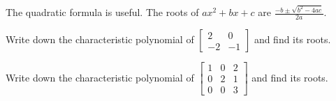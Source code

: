\documentclass[../main.tex]{subfiles}
\begin{document}
\faStar{} The quadratic formula is useful. The roots of \(ax^{2} + bx + c\) are \(\frac{-b \pm \sqrt{b^{2} - 4ac}}{2a}\).

\begin{example} \label{ex:char-poly-2x2}
  Write down the characteristic polynomial of \(\begin{bmatrix} 2 & 0 \\ -2 & -1 \end{bmatrix}\) and find its roots.

\end{example}

\begin{example} \label{ex:char-poly-3x3}
  Write down the characteristic polynomial of \(\begin{bmatrix} 1 & 0 & 2\\ 0 & 2 & 1 \\ 0 & 0 & 3 \end{bmatrix}\) and find its roots.

  \blanks*
\end{example}
\clearpage
\end{document}
